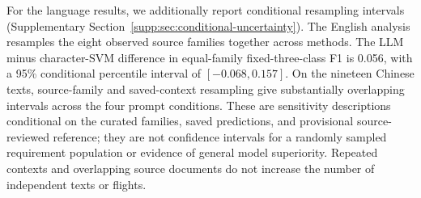 For the language results, we additionally report conditional resampling intervals (Supplementary Section~\ref{supp:sec:conditional-uncertainty}). The English analysis resamples the eight observed source families together across methods. The LLM minus character-SVM difference in equal-family fixed-three-class F1 is 0.056, with a 95\% conditional percentile interval of $[-0.068,0.157]$. On the nineteen Chinese texts, source-family and saved-context resampling give substantially overlapping intervals across the four prompt conditions. These are sensitivity descriptions conditional on the curated families, saved predictions, and provisional source-reviewed reference; they are not confidence intervals for a randomly sampled requirement population or evidence of general model superiority. Repeated contexts and overlapping source documents do not increase the number of independent texts or flights.
